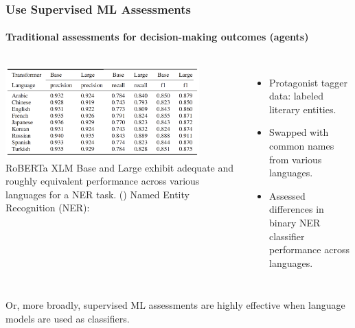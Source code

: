\documentclass[11pt,
               aspectratio=169,
               hyperref={colorlinks}
               ]{beamer}
\begin{document}
		\begin{frame}
			
			\frametitle{Use Supervised ML Assessments}
			\framesubtitle{Traditional assessments for decision-making outcomes (agents)}
			
			\begin{columns}
				\centering
				\newline  \newline  \newline
				\includegraphics[height=100pt]{../img/Superv_ML.png} 
				\newline
				\tiny{RoBERTa XLM Base and Large exhibit adequate and roughly equivalent performance across various languages for a NER task. (\cite{iqtlabs})}
				\vspace{-5pt}
				Named Entity Recognition (NER):\\
				\begin{itemize}
					\item Protagonist tagger data: labeled literary entities.
					\item Swapped with common names from various languages.
					\item Assessed differences in binary NER classifier performance across languages.
				\end{itemize}
			\end{columns}
			\vspace{10pt}
			\small{Or, more broadly, supervised ML assessments are highly effective when language models are used as classifiers.}
					
		\end{frame}
		
			
			
\end{document}
